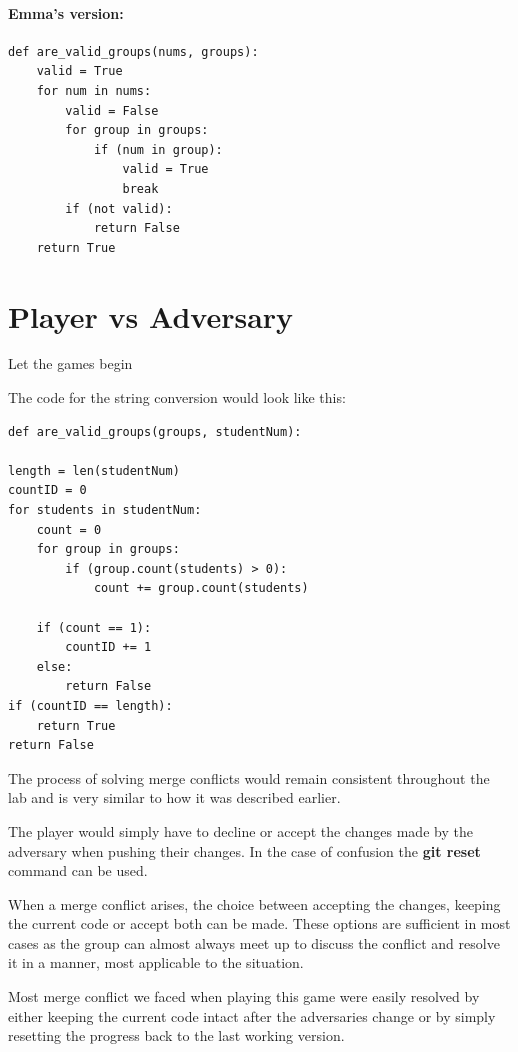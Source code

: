 \documentclass[twocolumn, 10pt]{article}
\begin{document}
\paragraph{Emma's version:}

\footnotesize
\begin{verbatim}
def are_valid_groups(nums, groups):
    valid = True
    for num in nums:
        valid = False
        for group in groups:
            if (num in group): 
                valid = True
                break
        if (not valid):
            return False
    return True
\end{verbatim}
\normalsize

\section{Player vs Adversary}
Let the games begin

The code for the string conversion would look like this:

\footnotesize
\begin{verbatim}
def are_valid_groups(groups, studentNum):

length = len(studentNum)
countID = 0   
for students in studentNum:
    count = 0
    for group in groups:
        if (group.count(students) > 0):
            count += group.count(students)

    if (count == 1):
        countID += 1
    else:
        return False
if (countID == length):
    return True
return False
\end{verbatim}
\normalsize

The process of solving merge conflicts would remain consistent throughout the lab and is very similar to how it was described earlier.

The player would simply have to decline or accept the changes made by the adversary when pushing their changes. In the case of confusion the \textbf{git reset} command can be used.

When a merge conflict arises, the choice between accepting the changes, keeping the current code or accept both can be made. These options are sufficient in most cases as the group can almost always meet up to discuss the conflict and resolve it in a manner, most applicable to the situation.

Most merge conflict we faced when playing this game were easily resolved by either keeping the current code intact after the adversaries change or by simply resetting the progress back to the last working version.
\end{document}
